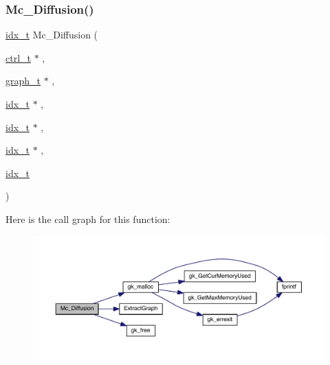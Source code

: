\mbox{\label{a00951_a5a01a370c18ddee7517dbbf9e5827f89}} 
\subsubsection{\texorpdfstring{Mc\+\_\+\+Diffusion()}{Mc\_Diffusion()}}
{\footnotesize\ttfamily \hyperlink{a00876_aaa5262be3e700770163401acb0150f52}{idx\+\_\+t} Mc\+\_\+\+Diffusion (\begin{DoxyParamCaption}\item[{\hyperlink{a00742}{ctrl\+\_\+t} $\ast$}]{,  }\item[{\hyperlink{a00734}{graph\+\_\+t} $\ast$}]{,  }\item[{\hyperlink{a00876_aaa5262be3e700770163401acb0150f52}{idx\+\_\+t} $\ast$}]{,  }\item[{\hyperlink{a00876_aaa5262be3e700770163401acb0150f52}{idx\+\_\+t} $\ast$}]{,  }\item[{\hyperlink{a00876_aaa5262be3e700770163401acb0150f52}{idx\+\_\+t} $\ast$}]{,  }\item[{\hyperlink{a00876_aaa5262be3e700770163401acb0150f52}{idx\+\_\+t}}]{ }\end{DoxyParamCaption})}

Here is the call graph for this function\+:\nopagebreak
\begin{figure}[H]
\begin{center}
\leavevmode
\includegraphics[width=350pt]{a00951_a5a01a370c18ddee7517dbbf9e5827f89_cgraph}
\end{center}
\end{figure}
\mbox{\label{a00951_aeeb2d9296e2305bdf67b62ba868ad55b}} 
